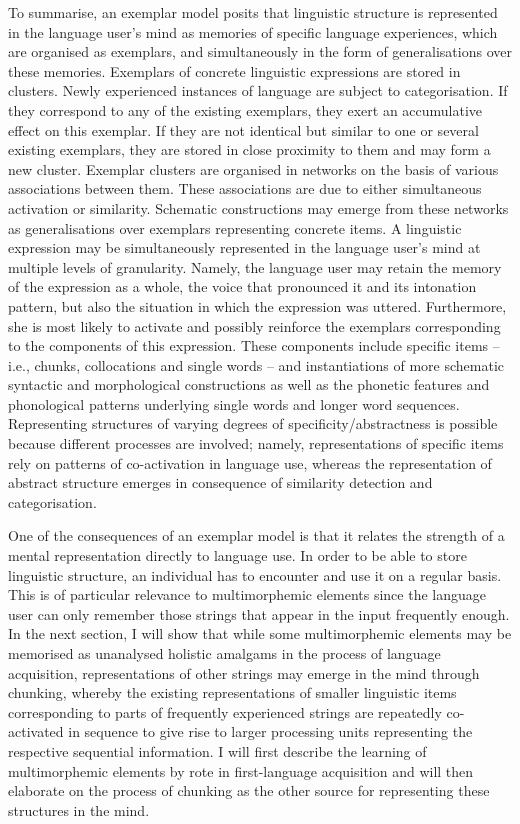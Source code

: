 To summarise, an exemplar model posits that linguistic structure is represented in the language user's mind as memories of specific language experiences, which are organised as exemplars, and simultaneously in the form of generalisations over these memories. Exemplars of concrete linguistic expressions are stored in clusters. Newly experienced instances of language are subject to categorisation. If they correspond to any of the existing exemplars, they exert an accumulative effect on this exemplar. If they are not identical but similar to one or several existing exemplars, they are stored in close proximity to them and may form a new cluster. Exemplar clusters are organised in networks on the basis of various associations between them. These associations are due to either simultaneous activation or similarity. Schematic constructions may emerge from these networks as generalisations over exemplars representing concrete items. A linguistic expression may be simultaneously represented in the language user's mind at multiple levels of granularity. Namely, the language user may retain the memory of the expression as a whole, the voice that pronounced it and its intonation pattern, but also the situation in which the expression was uttered. Furthermore, she is most likely to activate and possibly reinforce the exemplars corresponding to the components of this expression. These components include specific items -- i.e., chunks, collocations and single words -- and instantiations of more schematic syntactic and morphological constructions as well as the phonetic features and phonological patterns underlying single words and longer word sequences. Representing structures of varying degrees of specificity/abstractness is possible because different processes are involved; namely, representations of specific items rely on patterns of co-activation in language use, whereas the representation of abstract structure emerges in consequence of similarity detection and categorisation.

One of the consequences of an exemplar model is that it relates the strength of a mental representation directly to language use. In order to be able to store linguistic structure, an individual has to encounter and use it on a regular basis. This is of particular relevance to multimorphemic elements since the language user can only remember those strings that appear in the input frequently enough. In the next section, I will show that while some multimorphemic elements may be memorised as unanalysed holistic amalgams in the process of language acquisition, representations of other strings may emerge in the mind through chunking, whereby the existing representations of smaller linguistic items corresponding to parts of frequently experienced strings are repeatedly co-activated in sequence to give rise to larger processing units representing the respective sequential information. I will first describe the learning of multimorphemic elements by rote in first-language acquisition and will then elaborate on the process of chunking as the other source for representing these structures in the mind.

